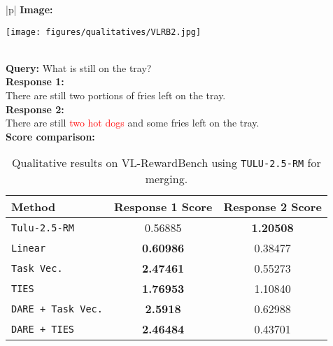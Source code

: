 \begin{table*}[hbtp]
    \begin{center}
        \begin{tabular}{|p{\textwidth}|}
        \hline
        \textbf{Image:}
        \begin{center}
            \texttt{[image: figures/qualitatives/VLRB2.jpg]}
        \end{center} \\
        \hline
        \textbf{Query:} What is still on the tray? \\
        \hline
        \textbf{Response 1:} \\
        There are still two portions of fries left on the tray. \\
        \hline
        \textbf{Response 2:} \\
        There are still \textcolor{Red}{two hot dogs} and some fries left on the tray. \\
        \hline
        \textbf{Score comparison:}
        \begin{center}
            \begin{tabular}{|l|c|c|}
                \hline
                \textbf{Method} & \textbf{Response 1 Score} & \textbf{Response 2 Score} \\
                \hline
                \texttt{Tulu-2.5-RM} & 0.56885 & \textbf{1.20508} \\
                \texttt{Linear} & \textbf{0.60986} & 0.38477 \\
                \texttt{Task Vec.} & \textbf{2.47461} & 0.55273 \\
                \texttt{TIES} & \textbf{1.76953} & 1.10840 \\
                \texttt{DARE + Task Vec.} & \textbf{2.5918} & 0.62988 \\
                \texttt{DARE + TIES} & \textbf{2.46484} & 0.43701 \\
                \hline
            \end{tabular} \\
        \end{center} \\
        \hline
        \end{tabular}
    \end{center}
    \caption{Qualitative results on VL-RewardBench using \texttt{TULU-2.5-RM} for merging.} 
    \label{tab:qualitative_results_2}
\end{table*}